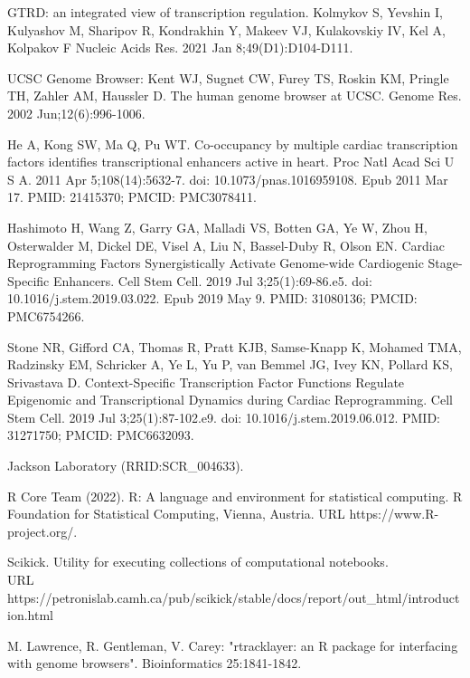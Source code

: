 \documentclass[12pt]{article}
\begin{document}

\begin{thebibliography}{99}

 GTRD: an integrated view of transcription regulation.
Kolmykov S, Yevshin I, Kulyashov M, Sharipov R, Kondrakhin Y, Makeev VJ,
Kulakovskiy IV, Kel A, Kolpakov F Nucleic Acids Res. 2021 Jan 8;49(D1):D104-D111.

 UCSC Genome Browser: Kent WJ, Sugnet CW, Furey TS, Roskin KM,
Pringle TH, Zahler AM, Haussler D. The human genome browser at UCSC. Genome Res.
2002 Jun;12(6):996-1006.

 He A, Kong SW, Ma Q, Pu WT. Co-occupancy by multiple cardiac
transcription factors identifies transcriptional enhancers active in heart.
Proc Natl Acad Sci U S A. 2011 Apr 5;108(14):5632-7. doi: 10.1073/pnas.1016959108.
Epub 2011 Mar 17. PMID: 21415370; PMCID: PMC3078411.

 Hashimoto H, Wang Z, Garry GA, Malladi VS, Botten GA, Ye W,
Zhou H, Osterwalder M, Dickel DE, Visel A, Liu N, Bassel-Duby R, Olson EN.
Cardiac Reprogramming Factors Synergistically Activate Genome-wide Cardiogenic
Stage-Specific Enhancers. Cell Stem Cell. 2019 Jul 3;25(1):69-86.e5.
doi: 10.1016/j.stem.2019.03.022. Epub 2019 May 9. PMID: 31080136;
PMCID: PMC6754266.

 Stone NR, Gifford CA, Thomas R, Pratt KJB, Samse-Knapp K,
Mohamed TMA, Radzinsky EM, Schricker A, Ye L, Yu P, van Bemmel JG, Ivey KN,
Pollard KS, Srivastava D. Context-Specific Transcription Factor Functions
Regulate Epigenomic and Transcriptional Dynamics during Cardiac Reprogramming.
Cell Stem Cell. 2019 Jul 3;25(1):87-102.e9. doi: 10.1016/j.stem.2019.06.012.
PMID: 31271750; PMCID: PMC6632093.

 Jackson Laboratory (RRID:SCR\_004633).

 R Core Team (2022).
R: A language and environment for statistical computing. R Foundation
for Statistical Computing, Vienna, Austria. URL https://www.R-project.org/.

Scikick. Utility for executing collections
of computational notebooks.\\
URL https://petronislab.camh.ca/pub/scikick/stable/docs/report/out\_html/introduction.html

 M. Lawrence, R. Gentleman, V. Carey: "rtracklayer: an {R}
package for interfacing with genome browsers". Bioinformatics 25:1841-1842.


\end{thebibliography}
\end{document}
